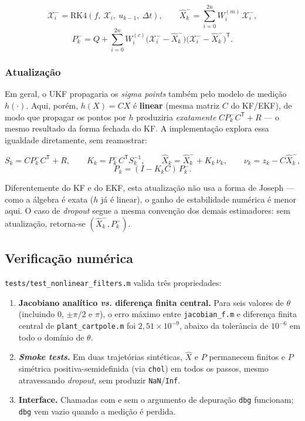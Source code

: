 \documentclass[brazil, 12pt]{article}
\begin{document}
\[
\mathcal{X}_i^{-} = \mathrm{RK4}(f,\ \mathcal{X}_i,\ u_{k-1},\ \Delta t),
\qquad
\hat X_k^{-} = \sum_{i=0}^{2n} W_i^{(m)}\,\mathcal{X}_i^{-},
\]
\[
P_k^{-} = Q + \sum_{i=0}^{2n} W_i^{(c)}\big(\mathcal{X}_i^{-}-\hat X_k^{-}\big)\big(\mathcal{X}_i^{-}-\hat X_k^{-}\big)^{\mathsf T}.
\]

\subsubsection{Atualização}

Em geral, o UKF propagaria os \emph{sigma points} também pelo modelo de
medição $h(\cdot)$. Aqui, porém, $h(X)=CX$ é \textbf{linear} (mesma matriz
$C$ do KF/EKF), de modo que propagar os pontos por $h$ produziria
\emph{exatamente} $C P_k^{-} C^{\mathsf T}+R$ — o mesmo resultado da forma
fechada do KF. A implementação explora essa igualdade diretamente, sem
reamostrar:

\[
S_k = C P_k^{-} C^{\mathsf T} + R, \qquad
K_k = P_k^{-} C^{\mathsf T} S_k^{-1}, \qquad
\hat X_k = \hat X_k^{-} + K_k\,\nu_k, \qquad
\nu_k = z_k - C\hat X_k^{-},
\]
\[
P_k = (I-K_kC)\,P_k^{-}.
\]

Diferentemente do KF e do EKF, esta atualização não usa a forma de Joseph —
como a álgebra é exata ($h$ já é linear), o ganho de estabilidade numérica é
menor aqui. O caso de \emph{dropout} segue a mesma convenção dos demais
estimadores: sem atualização, retorna-se $(\hat X_k^{-},P_k^{-})$.

\subsection{Verificação numérica}
\label{sec:ekf-verificacao}

\texttt{tests/test\_nonlinear\_filters.m} valida três propriedades:

\begin{enumerate}
  \item \textbf{Jacobiano analítico \emph{vs.} diferença finita central.}
  Para seis valores de $\theta$ (incluindo $0$, $\pm\pi/2$ e $\pi$), o erro
  máximo entre \texttt{jacobian\_f.m} e diferença finita central de
  \texttt{plant\_cartpole.m} foi $2{,}51\times10^{-9}$, abaixo da tolerância
  de $10^{-6}$ em todo o domínio de $\theta$.
  \item \textbf{\emph{Smoke tests}.} Em duas trajetórias sintéticas, $\hat X$
  e $P$ permanecem finitos e $P$ simétrica positiva-semidefinida (via
  \texttt{chol}) em todos os passos, mesmo atravessando \emph{dropout}, sem
  produzir \texttt{NaN}/\texttt{Inf}.
  \item \textbf{Interface.} Chamadas com e sem o argumento de depuração
  \texttt{dbg} funcionam; \texttt{dbg} vem vazio quando a medição é perdida.
\end{enumerate}
\end{document}
